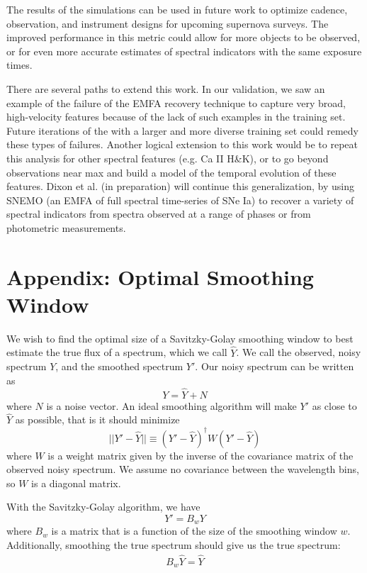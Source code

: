 The results of the simulations can be used in future work to optimize cadence, observation, and instrument designs for upcoming supernova surveys. The improved performance in this metric could allow for more objects to be observed, or for even more accurate estimates of spectral indicators with the same exposure times. 

There are several paths to extend this work. In our validation, we saw an example of the failure of the EMFA recovery technique to capture very broad, high-velocity features because of the lack of such examples in the training set. Future iterations of the with a larger and more diverse training set could remedy these types of failures. Another logical extension to this work would be to repeat this analysis for other spectral features (e.g. Ca II H\&K), or to go beyond observations near max and build a model of the temporal evolution of these features. Dixon et al. (in preparation) will continue this generalization, by using SNEMO \citep{saunders_improved_2018} (an EMFA of full spectral time-series of SNe Ia) to recover a variety of spectral indicators from spectra observed at a range of phases or from photometric measurements.

\section{Appendix: Optimal Smoothing Window}
\label{sg_optimal}
We wish to find the optimal size of a Savitzky-Golay smoothing window to best estimate the true flux of a spectrum, which we call $\hat{Y}$. We call the observed, noisy spectrum $Y$, and the smoothed spectrum $Y'$. Our noisy spectrum can be written as
\begin{equation}
    Y = \hat{Y}+N
\end{equation}
where $N$ is a noise vector. An ideal smoothing algorithm will make $Y'$ as close to $\hat{Y}$ as possible, that is it should minimize 
\begin{equation}
    ||Y'-\hat{Y}|| \equiv (Y'-\hat{Y})^\dagger W (Y'-\hat{Y})
\end{equation}
where $W$ is a weight matrix given by the inverse of the covariance matrix of the observed noisy spectrum. We assume no covariance between the wavelength bins, so $W$ is a diagonal matrix.

With the Savitzky-Golay algorithm, we have
\begin{equation}
    Y' = B_wY
\end{equation}
where $B_w$ is a matrix that is a function of the size of the smoothing window $w$. Additionally, smoothing the true spectrum should give us the true spectrum:
\begin{align}
    B_w\hat{Y}=\hat{Y}
\end{align}

